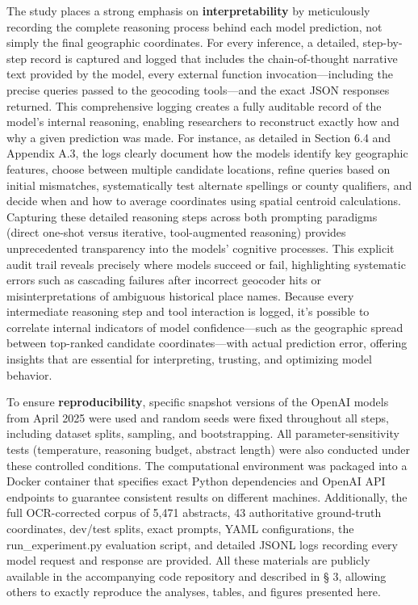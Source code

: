 The study places a strong emphasis on \textbf{interpretability} by
meticulously recording the complete reasoning process behind each model
prediction, not simply the final geographic coordinates. For every
inference, a detailed, step-by-step record is captured and logged that
includes the chain-of-thought narrative text provided by the model,
every external function invocation---including the precise queries
passed to the geocoding tools---and the exact JSON responses returned.
This comprehensive logging creates a fully auditable record of the
model's internal reasoning, enabling researchers to reconstruct exactly
how and why a given prediction was made. For instance, as detailed in
Section 6.4 and Appendix A.3, the logs clearly document how the models
identify key geographic features, choose between multiple candidate
locations, refine queries based on initial mismatches, systematically
test alternate spellings or county qualifiers, and decide when and how
to average coordinates using spatial centroid calculations. Capturing
these detailed reasoning steps across both prompting paradigms (direct
one-shot versus iterative, tool-augmented reasoning) provides
unprecedented transparency into the models' cognitive processes. This
explicit audit trail reveals precisely where models succeed or fail,
highlighting systematic errors such as cascading failures after
incorrect geocoder hits or misinterpretations of ambiguous historical
place names. Because every intermediate reasoning step and tool
interaction is logged, it's possible to correlate internal indicators of
model confidence---such as the geographic spread between top-ranked
candidate coordinates---with actual prediction error, offering insights
that are essential for interpreting, trusting, and optimizing model
behavior.

To ensure \textbf{reproducibility}, specific snapshot versions of the
OpenAI models from April 2025 were used and random seeds were fixed
throughout all steps, including dataset splits, sampling, and
bootstrapping. All parameter-sensitivity tests (temperature, reasoning
budget, abstract length) were also conducted under these controlled
conditions. The computational environment was packaged into a Docker
container that specifies exact Python dependencies and OpenAI API
endpoints to guarantee consistent results on different machines.
Additionally, the full OCR-corrected corpus of 5,471 abstracts, 43
authoritative ground-truth coordinates, dev/test splits, exact prompts,
YAML configurations, the run\_experiment.py evaluation script, and
detailed JSONL logs recording every model request and response are
provided. All these materials are publicly available in the accompanying
code repository and described in § 3, allowing others to exactly
reproduce the analyses, tables, and figures presented here.

